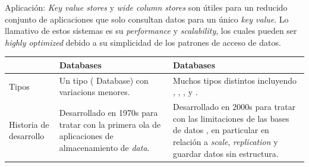 Aplicación: \textit{Key value stores} y \textit{wide column stores} son útiles para un reducido conjunto de aplicaciones que solo consultan datos para un único \textit{key value}. Lo llamativo de estos sistemas es su \textit{performance} y \textit{scalability}, los cuales pueden ser \textit{highly optimized} debido a su simplicidad de los patrones de acceso de datos.



\begin{table}[h!]
    \tiny
   
\begin{tabular}{ |L{0.1\paperwidth}|L{0.3\paperwidth}|L{0.3\paperwidth}|}
\hline
	&
	 Databases &
	 Databases
 
\\ \hline
	Tipos&%
	Un tipo ( Database) con variacions menores.& %
	Muchos tipos distintos incluyendo , , , y . %
	
\\ \hline
	Historia de desarrollo&%
	Desarrollado en 1970s para tratar con la primera ola de aplicaciones de almacenamiento de \textit{data}.&%
	Desarrollado en 2000s para tratar con las limitaciones de las bases de datos , en particular en relación a \textit{scale}, \textit{replication} y guardar datos sin estructura.%
	

\end{tabular}
\end{table}
